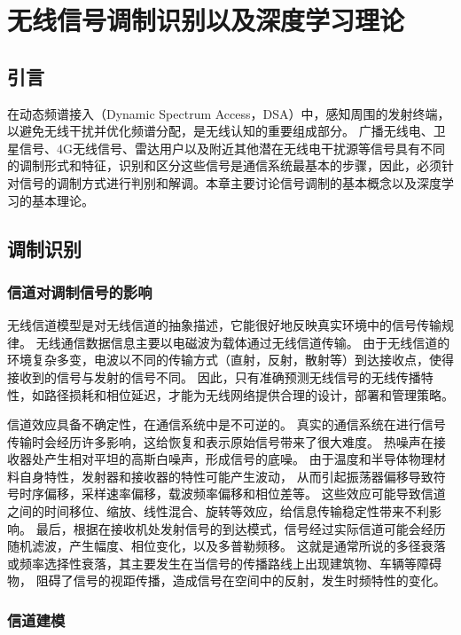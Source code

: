 
\chapter{无线信号调制识别以及深度学习理论}
\label{chap: mod_rec_deep_learning_theo}
\section{引言}
在动态频谱接入（Dynamic Spectrum Access，DSA）中，感知周围的发射终端，以避免无线干扰并优化频谱分配，是无线认知的重要组成部分。 广播无线电、卫星信号、4G无线信号、雷达用户以及附近其他潜在无线电干扰源等信号具有不同的调制形式和特征，识别和区分这些信号是通信系统最基本的步骤，因此，必须针对信号的调制方式进行判别和解调。本章主要讨论信号调制的基本概念以及深度学习的基本理论。

\section{调制识别}

\subsection{信道对调制信号的影响}
无线信道模型是对无线信道的抽象描述，它能很好地反映真实环境中的信号传输规律。
无线通信数据信息主要以电磁波为载体通过无线信道传输。 
由于无线信道的环境复杂多变，电波以不同的传输方式（直射，反射，散射等）到达接收点，使得接收到的信号与发射的信号不同。
因此，只有准确预测无线信号的无线传播特性，如路径损耗和相位延迟，才能为无线网络提供合理的设计，部署和管理策略。\par

信道效应具备不确定性，在通信系统中是不可逆的。
真实的通信系统在进行信号传输时会经历许多影响，这给恢复和表示原始信号带来了很大难度。
热噪声在接收器处产生相对平坦的高斯白噪声，形成信号的底噪。
由于温度和半导体物理材料自身特性，发射器和接收器的特性可能产生波动，
从而引起振荡器偏移导致符号时序偏移，采样速率偏移，载波频率偏移和相位差等。
这些效应可能导致信道之间的时间移位、缩放、线性混合、旋转等效应，给信息传输稳定性带来不利影响。
最后，根据在接收机处发射信号的到达模式，信号经过实际信道可能会经历随机滤波，产生幅度、相位变化，以及多普勒频移。
这就是通常所说的多径衰落或频率选择性衰落，其主要发生在当信号的传播路线上出现建筑物、车辆等障碍物，
阻碍了信号的视距传播，造成信号在空间中的反射，发生时频特性的变化。\par

\subsection{信道建模}

